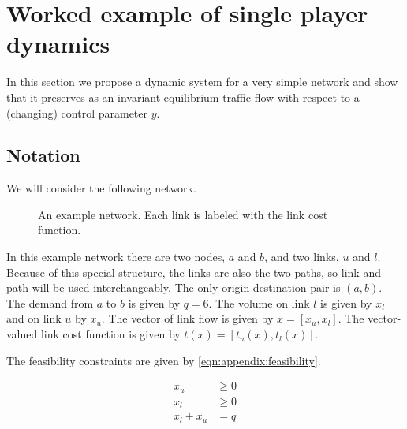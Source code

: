 \section{Worked example of single player dynamics}\label{sec:single-player-example}

In this section we propose a dynamic system for a very simple network and show that it preserves as an invariant equilibrium traffic flow with respect to a (changing) control parameter $y$.

\subsection{Notation}

We will consider the following network.

\begin{figure}[!ht]
    \centering
    \caption{An example network. Each link is labeled with the link cost function.}
    \label{fig:example-netowkr}
\end{figure}

In this example network there are two nodes, $a$ and $b$, and two links, $u$ and $l$. 
Because of this special structure, the links are also the two paths, so link and path will be used interchangeably.
The only origin destination pair is $(a, b)$.
The demand from $a$ to $b$ is given by $q=6$.
The volume on link $l$ is given by $x_l$ and on link $u$ by $x_u$.
The vector of link flow is given by $x=[x_u, x_l]$.
The vector-valued link cost function is given by $t(x) = [t_u(x), t_l(x)]$.

The feasibility constraints are given by \eqref{eqn:appendix:feasibility}.

\begin{subequations}
\begin{align}
    x_u &\geq 0\\
    x_l &\geq 0\\
    x_l + x_u &= q
\end{align}\label{eqn:appendix:feasibility}
\end{subequations}

